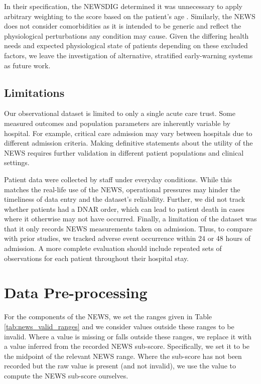 \documentclass[10pt,journal, compsoc]{IEEEtran}
\begin{document}
In their specification, the NEWSDIG determined it was unnecessary to apply arbitrary weighting to the score based on the patient's age \cite[pp.~19]{RCP17}. Similarly, the NEWS does not consider comorbidities as it is intended to be generic and reflect the physiological perturbations any condition may cause. Given the differing health needs and expected physiological state of patients depending on these excluded factors, we leave the investigation of alternative, stratified early-warning systems as future work.

\subsection{Limitations}
Our observational dataset is limited to only a single acute care trust. Some measured outcomes and population parameters are inherently variable by hospital. For example, critical care admission may vary between hospitals due to different admission criteria. Making definitive statements about the utility of the NEWS requires further validation in different patient populations and clinical settings.

Patient data were collected by staff under everyday conditions. While this matches the real-life use of the NEWS, operational pressures may hinder the timeliness of data entry and the dataset's reliability. Further, we did not track whether patients had a DNAR order, which can lead to patient death in cases where it otherwise may not have occurred. Finally, a limitation of the dataset was that it only records NEWS measurements taken on admission. Thus, to compare with prior studies, we tracked adverse event occurrence within 24 or 48 hours of admission. A more complete evaluation should include repeated sets of observations for each patient throughout their hospital stay.


\printbibliography


\onecolumn
\appendices
\setlength{\parskip}{\baselineskip}%
\setlength{\parindent}{0pt}%
\section{Data Pre-processing}
\label{appendix:preprocessing}
For the components of the NEWS, we set the ranges given in Table \ref{tab:news_valid_ranges} and we consider values outside these ranges to be invalid.
Where a value is missing or falls outside these ranges, we replace it with a value inferred from the recorded NEWS sub-score. Specifically, we set it to be the midpoint of the relevant NEWS range. Where the sub-score has not been recorded but the raw value is present (and not invalid), we use the value to compute the NEWS sub-score ourselves.
\end{document}
